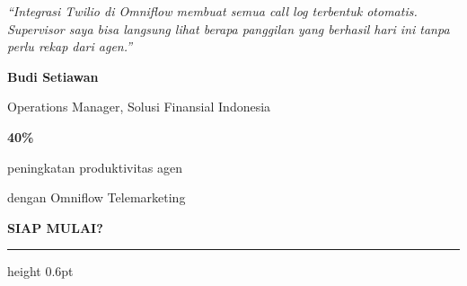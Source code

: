\documentclass[a4paper]{article}
\newcommand{\sectiontitle}[1]{%
    \vspace{10pt}%
    {\fontsize{13}{16}\selectfont\bfseries\color{BlueDark} #1}\par\vspace{3pt}%
    {\color{BluePrimary}\hrule height 0.6pt}\par\vspace{8pt}%
}
\begin{document}
\noindent
\begin{minipage}[t]{0.485\textwidth}
    \colorbox{BlueBg}{%
        \begin{minipage}{\dimexpr\linewidth-2\fboxsep\relax}
            \vspace{6pt}
            {\fontsize{9.5}{13}\selectfont\color{TextDark}\textit{``Integrasi Twilio di Omniflow membuat semua call log terbentuk otomatis. Supervisor saya bisa langsung lihat berapa panggilan yang berhasil hari ini tanpa perlu rekap dari agen.''}}\par\vspace{4pt}
            {\fontsize{8.5}{11}\selectfont\bfseries\color{BluePrimary} Budi Setiawan}\par
            {\fontsize{8}{10}\selectfont\color{TextLight} Operations Manager, Solusi Finansial Indonesia}
            \vspace{6pt}
        \end{minipage}}
\end{minipage}%
\hfill
\begin{minipage}[t]{0.485\textwidth}
    \colorbox{BlueBg}{%
        \begin{minipage}{\dimexpr\linewidth-2\fboxsep\relax}
            \vspace{6pt}
            \begin{center}
                {\fontsize{20}{24}\selectfont\bfseries\color{CrimsonPrimary} 40\%}\par
                {\fontsize{9.5}{12}\selectfont\color{TextDark} peningkatan produktivitas agen}\par
                {\fontsize{9.5}{12}\selectfont\color{TextDark} dengan Omniflow Telemarketing}
            \end{center}
            \vspace{6pt}
        \end{minipage}}
\end{minipage}

\sectiontitle{SIAP MULAI?}
\end{document}
